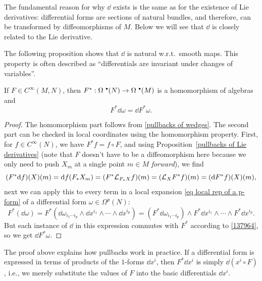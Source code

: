 The fundamental reason for why $\dd$ exists is the same as for the existence of Lie derivatives: differential forms are sections of natural bundles, and therefore, can be transformed by diffeomorphisms of $M$. Below we will see that $\dd$ is closely related to the Lie derivative.

The following proposition shows that $\dd$ is natural w.r.t.\ smooth maps. This property is often described as ``differentials are invariant under changes of variables''.

\begin{prop}
    If $F\in C^\infty(M,N)$, then $F^\ast:\Omega^{\smbullet }(N)\to\Omega^{\smbullet }(M)$ is a homomorphism of algebras and
    \[F^\ast \dd\omega=\dd F^\ast\omega.\]
\end{prop}
\begin{proof}
    The homomorphism part follows from \eqref{pullbacks of wedges}. The second part can be checked in local coordinates using the homomorphism property. First, for $f\in C^\infty(N)$, we have $F^\ast f=f\circ F$, and using Proposition~\ref{pullbacks of Lie derivatives} (note that $F$ doesn't have to be a diffeomorphism here because we only need to push $X_m$ at a single point $m\in M$ \emph{forward}), we find
    \[(F^\ast {\mathrm{d}} f)(X)(m)={\mathrm{d}} f(F_\ast X_m)=(F^\ast \mathcal{L}_{F_\ast X}f)(m)=(\mathcal{L}_X F^\ast f)(m)=({\mathrm{d}} F^\ast f)(X)(m),\label{137964}\]
    next we can apply this to every term in a local expansion \eqref{eq local rep of a p-form} of a differential form $\omega\in\Omega^p(N)$:
    \[F^\ast(\dd\omega)=F^\ast(\dd\omega_{i_1\cdots i_p}\wedge \dd x^{i_1}\wedge\cdots \wedge \dd x^{i_p})=(F^\ast\dd\omega_{i_1\cdots i_p})\wedge F^\ast \dd x^{i_1}\wedge\cdots\wedge F^\ast \dd x^{i_p}.\]
    But each instance of $\dd$ in this expression commutes with $F^\ast$ according to \eqref{137964}, so we get $\dd F^\ast\omega$.
\end{proof}

\begin{rem}
    The proof above explains how pullbacks work in practice. If a differential form is expressed in terms of products of the $1$-forms $\dd x^i$, then $F^\ast\dd x^i$ is simply $\dd (x^i\circ F)$, i.e., we merely substitute the values of $F$ into the basic differentials $\dd x^i$.
\end{rem}

